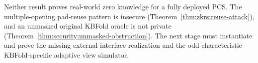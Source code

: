 Neither result proves real-world zero knowledge for a
fully deployed PCS. The multiple-opening pad-reuse pattern
is insecure (Theorem~\ref{thm:zkrs:reuse-attack}),
and an unmasked original KBFold oracle is not private
(Theorem~\ref{thm:security:unmasked-obstruction}).
The next stage must instantiate and prove the missing
external-interface realization and the odd-characteristic
KBFold-specific adaptive view simulator.
